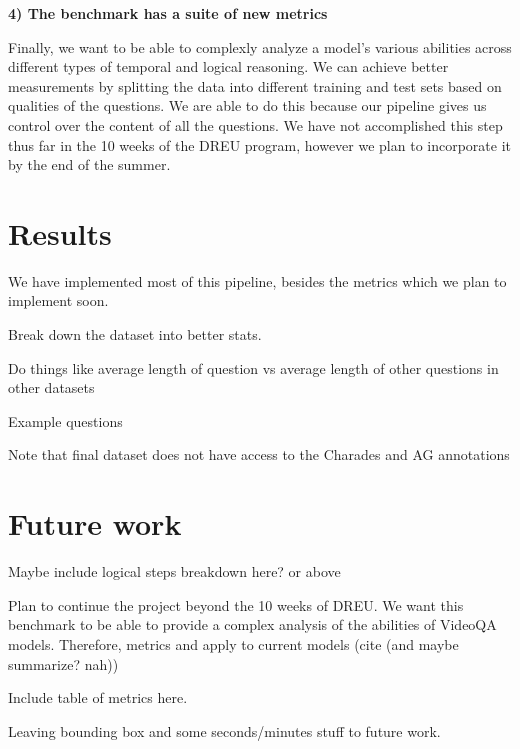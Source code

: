 \documentclass{article}
\begin{document}
    \textbf{4) The benchmark has a suite of new metrics}
    
    Finally, we want to be able to complexly analyze a model's various abilities across different types of temporal and logical reasoning. We can achieve better measurements by splitting the data into different training and test sets based on qualities of the questions. We are able to do this because our pipeline gives us control over the content of all the questions. We have not accomplished this step thus far in the 10 weeks of the DREU program, however we plan to incorporate it by the end of the summer. 

\section{Results}

We have implemented most of this pipeline, besides the metrics which we plan to implement soon. 

Break down the dataset into better stats. 

Do things like average length of question vs average length of other questions in other datasets

Example questions

Note that final dataset does not have access to the Charades and AG annotations



\section{Future work}

Maybe include logical steps breakdown here? or above

Plan to continue the project beyond the 10 weeks of DREU. We want this benchmark to be able to provide a complex analysis of the abilities of VideoQA models. Therefore, metrics and apply to current models (cite (and maybe summarize? nah))

Include table of metrics here. 

Leaving bounding box and some seconds/minutes stuff to future work. 



\small{
}
\end{document}
